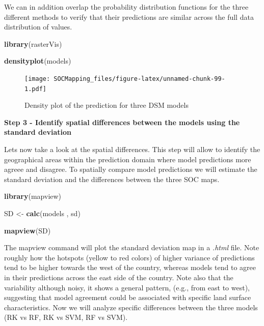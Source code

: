 \documentclass[10pt,b5paper,]{book}
\newenvironment{Shaded}{\begin{snugshade}}{\end{snugshade}}
\newcommand{\KeywordTok}[1]{\textcolor[rgb]{0.13,0.29,0.53}{\textbf{#1}}}
\newcommand{\NormalTok}[1]{#1}
\newcommand{\StringTok}[1]{\textcolor[rgb]{0.31,0.60,0.02}{#1}}
\theoremstyle{definition}
\theoremstyle{definition}
\theoremstyle{definition}
\theoremstyle{remark}
\begin{document}
We can in addition overlap the probability distribution functions for
the three different methods to verify that their predictions are similar
across the full data distribution of values.

\begin{Shaded}
\begin{Highlighting}[]
\KeywordTok{library}\NormalTok{(rasterVis)}

\KeywordTok{densityplot}\NormalTok{(models)}
\end{Highlighting}
\end{Shaded}

\begin{figure}
\centering
\texttt{[image: SOCMapping\_files/figure-latex/unnamed-chunk-99-1.pdf]}
\caption{\label{fig:unnamed-chunk-99}Density plot of the prediction for
three DSM models}
\end{figure}

\textbf{Step 3 - Identify spatial differences between the models using
the standard deviation}

Lets now take a look at the spatial differences. This step will allow to
identify the geographical areas within the prediction domain where model
predictions more agreee and disagree. To spatially compare model
predictions we will estimate the standard deviation and the differences
between the three SOC maps.

\begin{Shaded}
\begin{Highlighting}[]
\KeywordTok{library}\NormalTok{(mapview)}

\NormalTok{SD <-}\StringTok{ }\KeywordTok{calc}\NormalTok{(models , sd)}

\KeywordTok{mapview}\NormalTok{(SD)}
\end{Highlighting}
\end{Shaded}

The mapview command will plot the standard deviation map in a
\emph{.html} file. Note roughly how the hotspots (yellow to red colors)
of higher variance of predictions tend to be higher towards the west of
the country, whereas models tend to agree in their predictions across
the east side of the country. Note also that the variability although
noisy, it shows a general pattern, (e.g., from east to west), suggesting
that model agreement could be associated with specific land surface
characteristics. Now we will analyze specific differences between the
three models (RK vs RF, RK vs SVM, RF vs SVM).
\end{document}
